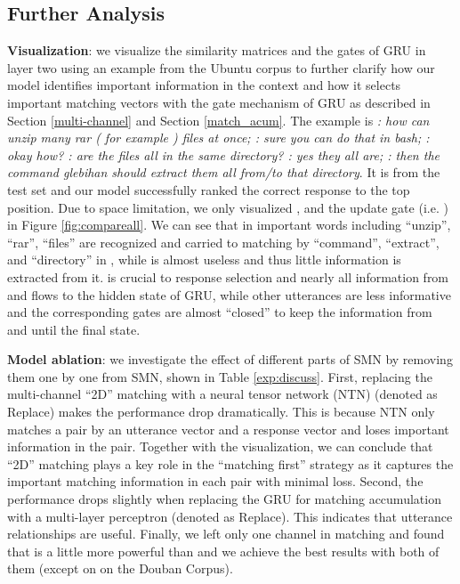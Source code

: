 \documentclass[11pt,a4paper]{article}
\begin{document}
	\subsection{Further Analysis}\label{analysis}
	\textbf{Visualization}: we visualize the similarity matrices and the gates of GRU in layer two using an example from the Ubuntu corpus to further clarify how our model identifies important information in the context and how it selects important matching vectors with the gate mechanism of GRU as described in Section \ref{multi-channel} and Section \ref{match_acum}. The example is \emph{ : how can unzip many rar (  for example ) files at once; : sure you can do that in bash; : okay how? : are the files all in the same directory? : yes they all are; : then the command glebihan should extract them all from/to that directory}. It is from the test set and our model successfully ranked the correct response to the top position. Due to space limitation, we only visualized ,  and  the update gate (i.e. ) in Figure \ref{fig:compareall}. We can see that in  important words including ``unzip'', ``rar'', ``files'' are recognized and carried to matching by ``command'', ``extract'', and ``directory'' in ,  while  is almost useless and thus little information is extracted from it.  is crucial to response selection and nearly all information from  and  flows to the hidden state of GRU, while other utterances are less informative and the corresponding gates are almost ``closed'' to keep the information from  and  until the final state.   
	
\textbf{Model ablation}: we investigate the effect of different parts of SMN by removing them one by one from SMN, shown in Table \ref{exp:discuss}. First, replacing the multi-channel ``2D'' matching with a neural tensor network (NTN) \cite{socher2013reasoning} (denoted as Replace) makes the performance drop dramatically. This is because NTN only matches a pair by an utterance vector and a response vector and loses important information in the pair. Together with the visualization, we can conclude that ``2D'' matching plays a key role in the ``matching first'' strategy as it captures the important matching information in each pair with minimal loss. Second, the performance drops slightly when replacing the GRU for matching accumulation with a multi-layer perceptron (denoted as Replace). This indicates that utterance relationships are useful. Finally, we left only one channel in matching and found that  is a little more powerful than  and we achieve the best results with both of them (except on  on the Douban Corpus).  
	
\end{document}
